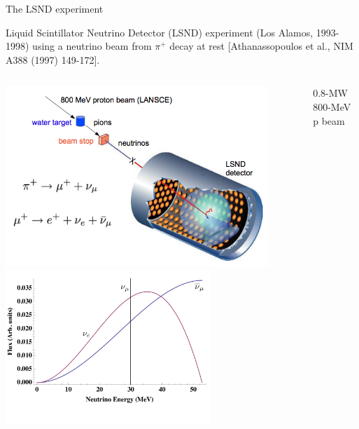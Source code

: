 \begin{frame}[t]{The LSND experiment}

{\scriptsize
Liquid Scintillator Neutrino Detector (LSND) experiment (Los Alamos, 1993-1998) using a neutrino beam
from $\pi^{+}$ decay at rest {\color{blue}[Athanassopoulos et al., NIM A388 (1997) 149-172]}.\\
}
\begin{columns}
  \begin{column}{0.50\textwidth}
   \begin{center}
    \includegraphics[width=0.90\textwidth]{./images/beyond3nu/accelerator/lsnd.png}\\
    \includegraphics[width=0.70\textwidth]{./images/beyond3nu/accelerator/dar_flux.png}\\
   \end{center}
  \end{column}
  \begin{column}{0.50\textwidth}
    \begin{itemize}
    {\scriptsize
     \item 0.8-MW 800-MeV p beam %
}
\end{itemize}
\end{column}
\end{columns}
\end{frame}
